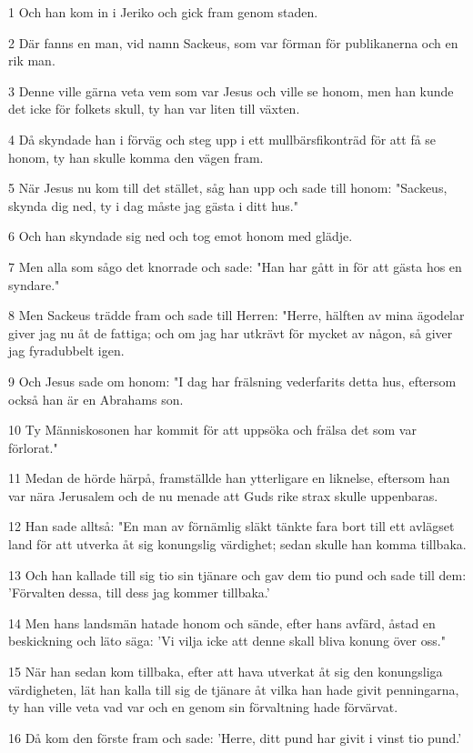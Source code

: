 \par 1 Och han kom in i Jeriko och gick fram genom staden.
\par 2 Där fanns en man, vid namn Sackeus, som var förman för publikanerna och en rik man.
\par 3 Denne ville gärna veta vem som var Jesus och ville se honom, men han kunde det icke för folkets skull, ty han var liten till växten.
\par 4 Då skyndade han i förväg och steg upp i ett mullbärsfikonträd för att få se honom, ty han skulle komma den vägen fram.
\par 5 När Jesus nu kom till det stället, såg han upp och sade till honom: "Sackeus, skynda dig ned, ty i dag måste jag gästa i ditt hus."
\par 6 Och han skyndade sig ned och tog emot honom med glädje.
\par 7 Men alla som sågo det knorrade och sade: "Han har gått in för att gästa hos en syndare."
\par 8 Men Sackeus trädde fram och sade till Herren: "Herre, hälften av mina ägodelar giver jag nu åt de fattiga; och om jag har utkrävt för mycket av någon, så giver jag fyradubbelt igen.
\par 9 Och Jesus sade om honom: "I dag har frälsning vederfarits detta hus, eftersom också han är en Abrahams son.
\par 10 Ty Människosonen har kommit för att uppsöka och frälsa det som var förlorat."
\par 11 Medan de hörde härpå, framställde han ytterligare en liknelse, eftersom han var nära Jerusalem och de nu menade att Guds rike strax skulle uppenbaras.
\par 12 Han sade alltså: "En man av förnämlig släkt tänkte fara bort till ett avlägset land för att utverka åt sig konungslig värdighet; sedan skulle han komma tillbaka.
\par 13 Och han kallade till sig tio sin tjänare och gav dem tio pund och sade till dem: 'Förvalten dessa, till dess jag kommer tillbaka.'
\par 14 Men hans landsmän hatade honom och sände, efter hans avfärd, åstad en beskickning och läto säga: 'Vi vilja icke att denne skall bliva konung över oss."
\par 15 När han sedan kom tillbaka, efter att hava utverkat åt sig den konungsliga värdigheten, lät han kalla till sig de tjänare åt vilka han hade givit penningarna, ty han ville veta vad var och en genom sin förvaltning hade förvärvat.
\par 16 Då kom den förste fram och sade: 'Herre, ditt pund har givit i vinst tio pund.'

